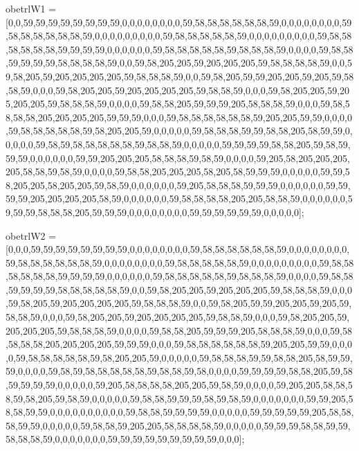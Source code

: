obetrlW1 = [0,0,59,59,59,59,59,59,59,59,0,0,0,0,0,0,0,0,59,58,58,58,58,58,58,59,0,0,0,0,0,0,0,0,59,58,58,58,58,58,58,59,0,0,0,0,0,0,0,0,0,59,58,58,58,58,58,59,0,0,0,0,0,0,0,0,0,59,58,58,58,58,58,58,59,59,59,59,0,0,0,0,0,0,59,58,58,58,58,58,59,58,58,58,59,0,0,0,0,59,58,58,59,59,59,59,58,58,58,58,59,0,0,59,58,205,205,59,205,205,205,59,58,58,58,58,59,0,0,59,58,205,59,205,205,205,205,59,58,58,58,59,0,0,59,58,205,59,59,205,205,59,205,59,58,58,59,0,0,0,59,58,205,205,59,205,205,205,205,59,58,58,59,0,0,0,59,58,205,205,59,205,205,205,59,58,58,58,59,0,0,0,0,59,58,58,205,59,59,59,205,58,58,58,59,0,0,0,59,58,58,58,58,205,205,205,205,59,59,59,0,0,0,59,58,58,58,58,58,58,59,205,205,59,59,0,0,0,0,59,58,58,58,58,58,59,58,205,205,59,0,0,0,0,0,59,58,58,58,59,59,58,58,205,58,59,59,0,0,0,0,0,59,58,59,58,58,58,58,58,59,58,58,59,0,0,0,0,0,59,59,59,59,58,58,205,59,58,59,59,59,0,0,0,0,0,0,59,59,205,205,205,58,58,58,59,58,59,0,0,0,0,59,205,58,205,205,205,205,58,58,59,58,59,0,0,0,0,59,58,58,205,205,205,58,205,58,59,59,59,0,0,0,0,0,59,59,58,205,205,58,205,205,59,58,59,0,0,0,0,0,0,59,205,58,58,58,59,59,59,0,0,0,0,0,0,59,59,59,59,205,205,205,205,58,59,0,0,0,0,0,0,59,58,58,58,58,205,205,58,58,59,0,0,0,0,0,0,59,59,59,58,58,58,205,59,59,59,0,0,0,0,0,0,0,0,59,59,59,59,59,59,0,0,0,0,0];

obetrlW2 = [0,0,0,59,59,59,59,59,59,59,59,0,0,0,0,0,0,0,0,59,58,58,58,58,58,58,59,0,0,0,0,0,0,0,0,59,58,58,58,58,58,58,59,0,0,0,0,0,0,0,0,59,58,58,58,58,58,59,0,0,0,0,0,0,0,0,0,59,58,58,58,58,58,58,59,59,59,59,0,0,0,0,0,0,59,58,58,58,58,58,59,58,58,58,59,0,0,0,0,59,58,58,59,59,59,59,58,58,58,58,58,59,0,0,59,58,205,205,59,205,205,205,59,58,58,58,59,0,0,0,59,58,205,59,205,205,205,205,59,58,58,58,59,0,0,59,58,205,59,59,205,205,59,205,59,58,58,59,0,0,0,59,58,205,205,59,205,205,205,205,59,58,58,59,0,0,0,59,58,205,205,59,205,205,205,59,58,58,58,59,0,0,0,0,59,58,58,205,59,59,59,205,58,58,58,59,0,0,0,59,58,58,58,58,205,205,205,205,59,59,59,0,0,0,59,58,58,58,58,58,58,59,205,205,59,59,0,0,0,0,59,58,58,58,58,58,59,58,205,205,59,0,0,0,0,0,59,58,58,58,59,59,58,58,205,58,59,59,59,0,0,0,0,59,58,59,58,58,58,58,58,59,58,58,59,58,0,0,0,0,59,59,59,59,58,58,205,59,58,59,59,59,59,0,0,0,0,0,59,205,58,58,58,58,205,205,59,58,59,0,0,0,0,59,205,205,58,58,58,59,58,205,59,58,59,0,0,0,0,0,59,58,58,59,59,59,58,59,58,59,0,0,0,0,0,0,0,59,59,205,58,58,59,59,0,0,0,0,0,0,0,0,0,0,59,58,58,59,59,59,59,0,0,0,0,0,59,59,59,59,59,205,58,58,58,59,59,0,0,0,0,0,59,58,58,59,205,205,58,58,58,58,59,0,0,0,0,0,59,59,59,58,58,59,59,58,58,58,59,0,0,0,0,0,0,0,59,59,59,59,59,59,59,59,59,0,0,0];

